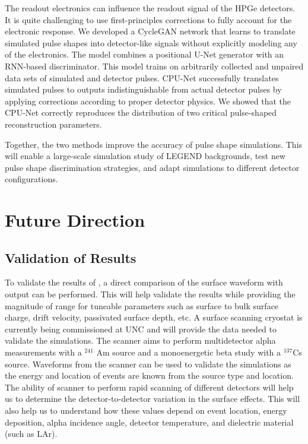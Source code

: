 The readout electronics can influence the readout signal of the HPGe detectors. It is quite challenging to use first-principles corrections to fully account for the electronic response. We developed a CycleGAN network that learns to translate simulated pulse shapes into detector-like signals without explicitly modeling any of the electronics. The model combines a positional U-Net generator with an RNN-based discriminator. This model trains on arbitrarily collected and unpaired data sets of simulated and detector pulses. CPU-Net successfully translates simulated pulses to outputs indistinguishable from actual detector pulses by applying corrections according to proper detector physics.  We showed that the CPU-Net correctly reproduces the distribution of two critical pulse-shaped reconstruction parameters.

Together, the two methods improve the accuracy of pulse shape simulations. This will enable a large-scale simulation study of LEGEND backgrounds, test new pulse shape discrimination strategies, and adapt simulations to different detector configurations.  

\section{Future Direction}

\subsection{Validation of Results}
To validate the results of {\ehd}, a direct comparison of the surface waveform with {\ehd} output can be performed. This will help validate the results while providing the magnitude of range for tuneable parameters such as surface to bulk surface charge, drift velocity, passivated surface depth, etc. A surface scanning cryostat is currently being commissioned at UNC and will provide the data needed to validate the simulations. The scanner aims to perform multidetector alpha measurements with a $^{241}$ Am source and a monoenergetic beta study with a $^{137}$Cs source. Waveforms from the scanner can be used to validate the simulations as the energy and location of events are known from the source type and location. The ability of scanner to perform rapid scanning of different detectors will help us to determine the detector-to-detector variation in the surface effects. This will also help us to understand how these values depend on event location, energy deposition, alpha incidence angle, detector temperature, and dielectric material (such as LAr).

